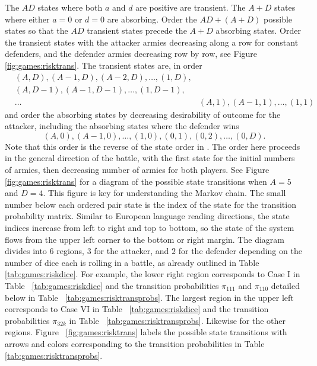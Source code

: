\documentclass[12pt]{article}
\begin{document}
The \( AD \) states where both \( a \) and \( d \) are positive are
transient.  The \( A + D \) states where either \( a = 0 \) or \( d = 0 \)
are absorbing.  Order the \( AD + (A + D) \) possible states so that the
\( AD \) transient states precede the \( A + D \) absorbing states.
Order the transient states with the attacker armies decreasing along a
row for constant defenders, and the defender armies decreasing row by
row, see Figure~%
\ref{fig:games:risktrans}. The transient states are, in order
\begin{align*}
    & (A, D), (A-1, D), (A-2, D), \dots, (1, D), \\
        & (A, D-1), (A-1, D-1), \dots, (1, D-1), \\
        & \dots & (A, 1), (A-1, 1), \dots, (1,1)
\end{align*}
and order the absorbing states by decreasing desirability of outcome for
the attacker, including the absorbing states where the defender wins
\[
    (A, 0), (A-1, 0),\dots, (1, 0), (0, 1), (0, 2),\dots, (0, D).
\] Note that this order is the reverse of the state order in
\cite{osborne03}.  The order here proceeds in the general direction of
the battle, with the first state for the initial numbers of armies, then
decreasing number of armies for both players.  See Figure~%
\ref{fig:games:risktrans} for a diagram of the possible state
transitions when \( A = 5 \) and \( D = 4 \).  This figure is key for
understanding the Markov chain.  The small number below each ordered
pair state is the index of the state for the transition probability
matrix.  Similar to European language reading directions, the state
indices increase from left to right and top to bottom, so the state of
the system flows from the upper left corner to the bottom or right
margin.  The diagram divides into \( 6 \) regions, \( 3 \) for the
attacker, and \( 2 \) for the defender depending on the number of dice
each is rolling in a battle, as already outlined in Table~%
\ref{tab:games:riskdice}.  For example, the lower right region
corresponds to Case I in Table~%
\ref{tab:games:riskdice} and the transition probabilities \( \pi_{111} \)
and \( \pi_{110} \) detailed below in Table~%
\ref{tab:games:risktransprobs}.  The largest region in the upper left
corresponds to Case VI in Table~%
\ref{tab:games:riskdice} and the transition probabilities \( \pi_{32k} \)
in Table~%
\ref{tab:games:risktransprobs}.  Likewise for the other regions.
Figure~%
\ref{fig:games:risktrans} labels the possible state transitions with
arrows and colors corresponding to the transition probabilities in
Table~%
\ref{tab:games:risktransprobs}.
\end{document}
